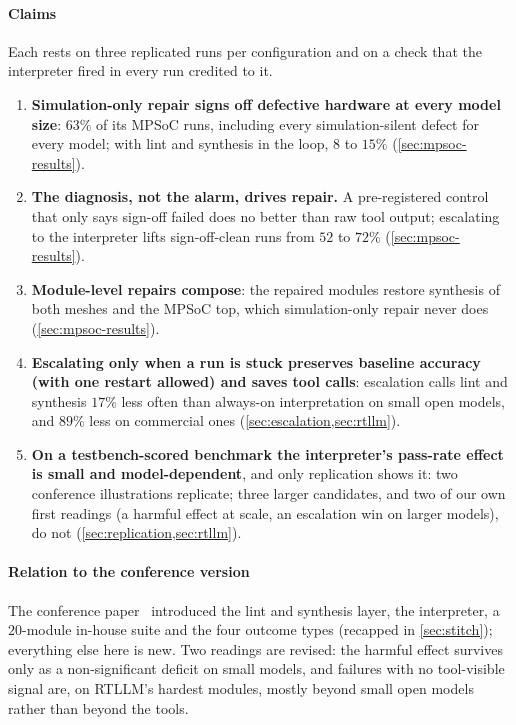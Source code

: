 \documentclass[11pt]{article}
\begin{document}
\paragraph{Claims} Each rests on three replicated runs per configuration and on a
check that the interpreter fired in every run credited to it.
\begin{enumerate}[label=\textbf{\sffamily C\arabic*.}, leftmargin=2.1em, itemsep=0.15em]
\item \textbf{Simulation-only repair signs off defective hardware at every model
size}: $63\%$ of its MPSoC runs, including every simulation-silent defect for
every model; with lint and synthesis in the loop, $8$ to $15\%$
(\cref{sec:mpsoc-results}).
\item \textbf{The diagnosis, not the alarm, drives repair.} A pre-registered
control that only says sign-off failed does no better than raw tool output;
escalating to the interpreter lifts sign-off-clean runs from $52$ to $72\%$
(\cref{sec:mpsoc-results}).
\item \textbf{Module-level repairs compose}: the repaired modules restore
synthesis of both meshes and the MPSoC top, which simulation-only repair never
does (\cref{sec:mpsoc-results}).
\item \textbf{Escalating only when a run is stuck preserves baseline accuracy (with
one restart allowed) and saves tool calls}: escalation calls lint and synthesis
$17\%$ less often than always-on interpretation on small open models, and $89\%$
less on commercial ones (\cref{sec:escalation,sec:rtllm}).
\item \textbf{On a testbench-scored benchmark the interpreter's pass-rate effect
is small and model-dependent}, and only replication shows it: two conference
illustrations replicate; three larger candidates, and two of our own first
readings (a harmful effect at scale, an escalation win on larger models), do not
(\cref{sec:replication,sec:rtllm}).
\end{enumerate}

\paragraph{Relation to the conference version} The conference
paper~\cite{stitch26} introduced the lint and synthesis layer, the interpreter,
a $20$-module in-house suite and the four outcome types (recapped in
\cref{sec:stitch}); everything else here is new. Two readings are revised: the
harmful effect survives only as a non-significant deficit on small models, and
failures with no tool-visible signal are, on RTLLM's hardest modules, mostly
beyond small open models rather than beyond the tools.
\end{document}
